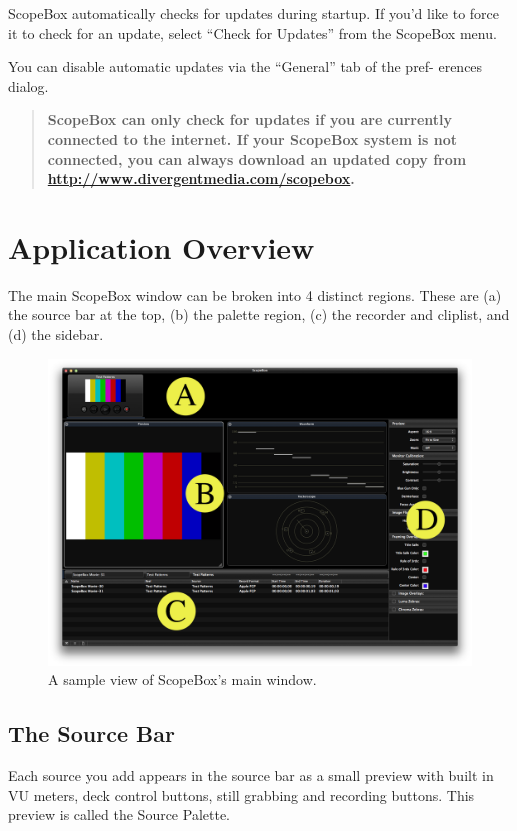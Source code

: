 \documentclass[10,letterpaper,]{report}
\begin{document}
ScopeBox automatically checks for updates during startup. If you'd like
to force it to check for an update, select ``Check for Updates'' from
the ScopeBox menu.

You can disable automatic updates via the ``General'' tab of the pref-
erences dialog.

\begin{quote}
\textbf{ScopeBox can only check for updates if you are currently
connected to the internet. If your ScopeBox system is not connected, you
can always download an updated copy from
\url{http://www.divergentmedia.com/scopebox}.}
\end{quote}

\chapter{Application Overview}

The main ScopeBox window can be broken into 4 distinct regions. These
are (a) the source bar at the top, (b) the palette region, (c) the
recorder and cliplist, and (d) the sidebar.

\begin{figure}[htbp]
\centering
\includegraphics{images/MainWindowWithLabels.png}
\caption{A sample view of ScopeBox's main window.}
\end{figure}

\section{The Source Bar}

Each source you add appears in the source bar as a small preview with
built in VU meters, deck control buttons, still grabbing and recording
buttons. This preview is called the Source Palette.
\end{document}
